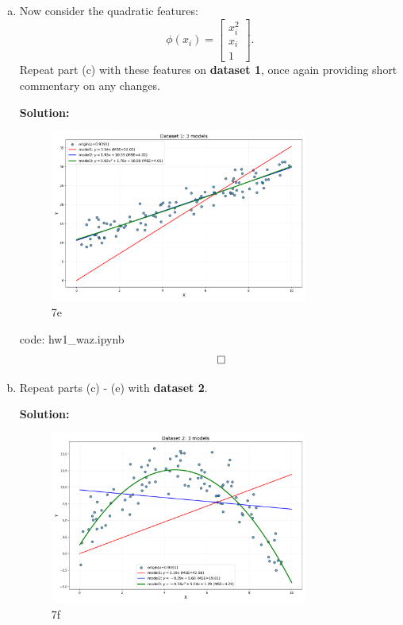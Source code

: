 \documentclass{article}
\newenvironment{solution}{\color{blue} \smallskip \textbf{Solution:}}{}
\begin{document}
\begin{enumerate}[(a)]
\begin{solution}
        code: hw1\_waz.ipynb
        \[ \qedhere \]
    \end{solution}
    
    \item 
    Now consider the quadratic features:
    \[
        \phi(x_i) = \begin{bmatrix}
            x_i^2 \\
            x_i \\
            1
        \end{bmatrix}.
    \]
    Repeat part (c) with these features on \textbf{dataset 1}, once again providing short commentary on any changes.
    
    \begin{solution}

        \begin{figure}[htbp]
        \centering
        \includegraphics[width=0.8\textwidth]{problem_7e.png} 
        \caption{7e} 
        \label{fig:fig7e} 
        \end{figure}

        code: hw1\_waz.ipynb
        \[ \qedhere \]
    \end{solution}
    
    \item
    Repeat parts (c) - (e) with \textbf{dataset 2}.
    
    \begin{solution}

        \begin{figure}[H]
        \centering
        \includegraphics[width=0.8\textwidth]{problem_7f.png} 
        \caption{7f} 
        \label{fig:fig7f} 
        \end{figure}


\end{solution}
\end{enumerate}
\end{document}
